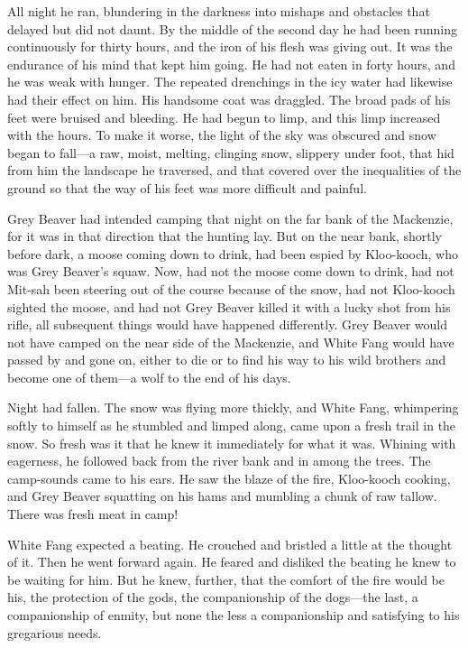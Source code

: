 \documentclass[10pt]{book}
\begin{document}
All night he ran, blundering in the darkness into mishaps and obstacles
that delayed but did not daunt. By the middle of the second day he had
been running continuously for thirty hours, and the iron of his flesh
was giving out. It was the endurance of his mind that kept him going.
He had not eaten in forty hours, and he was weak with hunger. The
repeated drenchings in the icy water had likewise had their effect on
him. His handsome coat was draggled. The broad pads of his feet were
bruised and bleeding. He had begun to limp, and this limp increased
with the hours. To make it worse, the light of the sky was obscured and
snow began to fall—a raw, moist, melting, clinging snow, slippery under
foot, that hid from him the landscape he traversed, and that covered
over the inequalities of the ground so that the way of his feet was
more difficult and painful.

Grey Beaver had intended camping that night on the far bank of the
Mackenzie, for it was in that direction that the hunting lay. But on
the near bank, shortly before dark, a moose coming down to drink, had
been espied by Kloo-kooch, who was Grey Beaver’s squaw. Now, had not
the moose come down to drink, had not Mit-sah been steering out of the
course because of the snow, had not Kloo-kooch sighted the moose, and
had not Grey Beaver killed it with a lucky shot from his rifle, all
subsequent things would have happened differently. Grey Beaver would
not have camped on the near side of the Mackenzie, and White Fang would
have passed by and gone on, either to die or to find his way to his
wild brothers and become one of them—a wolf to the end of his days.

Night had fallen. The snow was flying more thickly, and White Fang,
whimpering softly to himself as he stumbled and limped along, came upon
a fresh trail in the snow. So fresh was it that he knew it immediately
for what it was. Whining with eagerness, he followed back from the
river bank and in among the trees. The camp-sounds came to his ears. He
saw the blaze of the fire, Kloo-kooch cooking, and Grey Beaver
squatting on his hams and mumbling a chunk of raw tallow. There was
fresh meat in camp!

White Fang expected a beating. He crouched and bristled a little at the
thought of it. Then he went forward again. He feared and disliked the
beating he knew to be waiting for him. But he knew, further, that the
comfort of the fire would be his, the protection of the gods, the
companionship of the dogs—the last, a companionship of enmity, but none
the less a companionship and satisfying to his gregarious needs.
\end{document}
